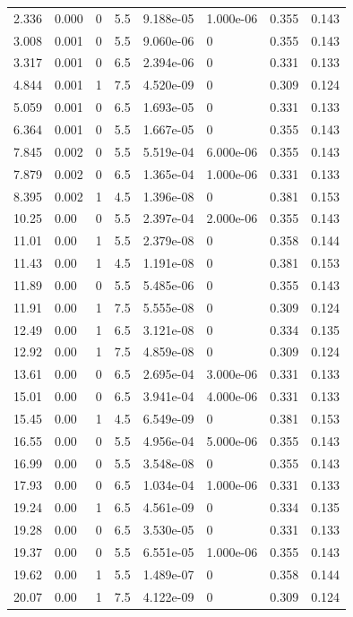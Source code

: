 \documentclass[preview]{standalone}
\begin{document}
{{\begin{tabular}{L{1.2cm}C{1.2cm} C{0.3cm}C{0.5cm} C{1.4cm}C{1.4cm} C{1.4cm}C{1.4cm}}
  2.336  &  0.000  & 0     & 5.5 &  9.188e-05  & 1.000e-06  & 0.355 &  0.143   \\ 
  3.008  &  0.001  & 0     & 5.5 &  9.060e-06  & 0  & 0.355 &  0.143   \\ 
  3.317  &  0.001  & 0     & 6.5 &  2.394e-06  & 0  & 0.331 &  0.133   \\ 
  4.844  &  0.001  & 1     & 7.5 &  4.520e-09  & 0  & 0.309 &  0.124   \\ 
  5.059  &  0.001  & 0     & 6.5 &  1.693e-05  & 0  & 0.331 &  0.133   \\ 
  6.364  &  0.001  & 0     & 5.5 &  1.667e-05  & 0  & 0.355 &  0.143   \\ 
  7.845  &  0.002  & 0     & 5.5 &  5.519e-04  & 6.000e-06  & 0.355 &  0.143   \\ 
  7.879  &  0.002  & 0     & 6.5 &  1.365e-04  & 1.000e-06  & 0.331 &  0.133   \\ 
  8.395  &  0.002  & 1     & 4.5 &  1.396e-08  & 0  & 0.381 &  0.153   \\ 
  10.25  &  0.00  & 0     & 5.5 &  2.397e-04  & 2.000e-06  & 0.355 &  0.143   \\ 
  11.01  &  0.00  & 1     & 5.5 &  2.379e-08  & 0  & 0.358 &  0.144   \\ 
  11.43  &  0.00  & 1     & 4.5 &  1.191e-08  & 0  & 0.381 &  0.153   \\ 
  11.89  &  0.00  & 0     & 5.5 &  5.485e-06  & 0  & 0.355 &  0.143   \\ 
  11.91  &  0.00  & 1     & 7.5 &  5.555e-08  & 0  & 0.309 &  0.124   \\ 
  12.49  &  0.00  & 1     & 6.5 &  3.121e-08  & 0  & 0.334 &  0.135   \\ 
  12.92  &  0.00  & 1     & 7.5 &  4.859e-08  & 0  & 0.309 &  0.124   \\ 
  13.61  &  0.00  & 0     & 6.5 &  2.695e-04  & 3.000e-06  & 0.331 &  0.133   \\ 
  15.01  &  0.00  & 0     & 6.5 &  3.941e-04  & 4.000e-06  & 0.331 &  0.133   \\ 
  15.45  &  0.00  & 1     & 4.5 &  6.549e-09  & 0  & 0.381 &  0.153   \\ 
  16.55  &  0.00  & 0     & 5.5 &  4.956e-04  & 5.000e-06  & 0.355 &  0.143   \\ 
  16.99  &  0.00  & 0     & 5.5 &  3.548e-08  & 0  & 0.355 &  0.143   \\ 
  17.93  &  0.00  & 0     & 6.5 &  1.034e-04  & 1.000e-06  & 0.331 &  0.133   \\ 
  19.24  &  0.00  & 1     & 6.5 &  4.561e-09  & 0  & 0.334 &  0.135   \\ 
  19.28  &  0.00  & 0     & 6.5 &  3.530e-05  & 0  & 0.331 &  0.133   \\ 
  19.37  &  0.00  & 0     & 5.5 &  6.551e-05  & 1.000e-06  & 0.355 &  0.143   \\ 
  19.62  &  0.00  & 1     & 5.5 &  1.489e-07  & 0  & 0.358 &  0.144   \\ 
  20.07  &  0.00  & 1     & 7.5 &  4.122e-09  & 0  & 0.309 &  0.124   \\ 
\hline 
\end{tabular} 

}}
\end{document}
